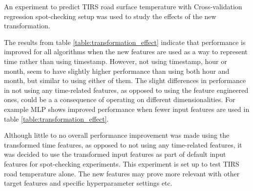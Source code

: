 	An experiment to predict TIRS road surface temperature with Cross-validation regression spot-checking setup was used to study the effects of the new transformation.

	\begin{table}[H] %
	\centering
	\caption{Experiment to see the effects of transforming the time feature is relevant to use as input feature. }
	\end{table}

	The results from table \ref{table:transformation_effect} indicate that performance is improved for all algorithms when the new features are used as a way to represent time rather than using timestamp. However, not using timestamp, hour or month, seem to have slightly higher performance than using both hour and month, but similar to using either of them. The slight differences in performance in not using any time-related features, as opposed to using the feature engineered ones, could be a a consequence of operating on different dimensionalities. For example MLP shows improved performance when fewer input features are used in table \ref{table:transformation_effect}. 

Although little to no overall performance improvement was made using the transformed time features, as opposed to not using any time-related features, it was decided to use the transformed input features as part of default input features for spot-checking experiments. This experiment is set up to test TIRS road temperature alone. The new features may prove more relevant with other target features and specific hyperparameter settings etc.


